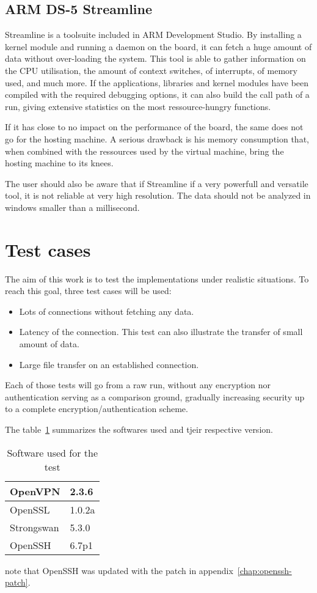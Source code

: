 \subsection{ARM DS-5 Streamline}
Streamline is a toolsuite included in ARM Development Studio.
By installing a kernel module and running a daemon on the board, it can fetch a huge amount of data without over-loading the system.
This tool is able to gather information on the CPU utilisation, the amount of context switches, of interrupts, of memory used, and much more.
If the applications, libraries and kernel modules have been compiled with the required debugging options, it can also build the call path of a run, giving extensive statistics on the most ressource-hungry functions.

If it has close to no impact on the performance of the board, the same does not go for the hosting machine.
A serious drawback is his memory consumption that, when combined with the ressources used by the virtual machine, bring the hosting machine to its knees.

\noindent The user should also be aware that if Streamline if a very powerfull and versatile tool, it is not reliable at very high resolution.
The data should not be analyzed in windows smaller than a millisecond.

\section{Test cases}
The aim of this work is to test the implementations under realistic situations.
To reach this goal, three test cases will be used:
\begin{itemize}
	\item Lots of connections without fetching any data.
	\item Latency of the connection. This test can also illustrate the transfer of small amount of data.
	\item Large file transfer on an established connection.
\end{itemize}

Each of those tests will go from a raw run, without any encryption nor authentication serving as a comparison ground, gradually increasing security up to a complete encryption/authentication scheme.

The table~\ref{tab:software-version} summarizes the softwares used and tjeir respective version.

\begin{table}
\center
\begin{tabular}{|l|l|} \hline
OpenVPN & 2.3.6 \\ \hline
OpenSSL & 1.0.2a \\ \hline
Strongswan & 5.3.0 \\ \hline
OpenSSH & 6.7p1 \\ \hline
\end{tabular}
\caption{Software used for the test}{note that OpenSSH was updated with the patch in appendix~\ref{chap:openssh-patch}.}
\label{tab:software-version}
\end{table}

